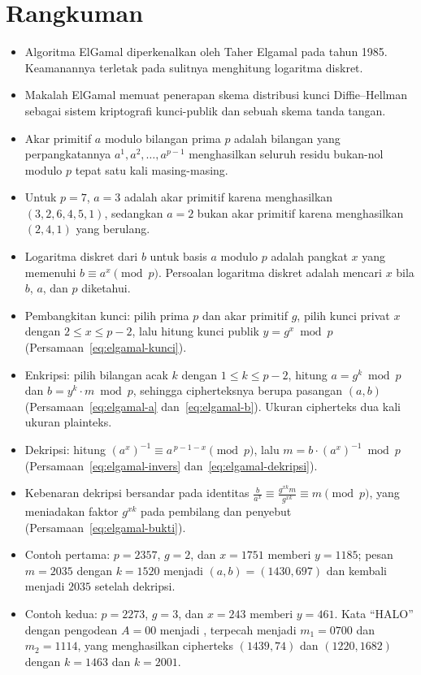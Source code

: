 \section{Rangkuman}
\begin{itemize}
    \item Algoritma ElGamal diperkenalkan oleh Taher Elgamal pada tahun 1985.
    Keamanannya terletak pada sulitnya menghitung logaritma diskret.
    \item Makalah ElGamal memuat penerapan skema distribusi kunci
    Diffie--Hellman sebagai sistem kriptografi kunci-publik dan sebuah skema
    tanda tangan.
    \item Akar primitif $a$ modulo bilangan prima $p$ adalah bilangan yang
    perpangkatannya $a^{1}, a^{2}, \dots, a^{p-1}$ menghasilkan seluruh residu
    bukan-nol modulo $p$ tepat satu kali masing-masing.
    \item Untuk $p = 7$, $a = 3$ adalah akar primitif karena menghasilkan
    $(3, 2, 6, 4, 5, 1)$, sedangkan $a = 2$ bukan akar primitif karena
    menghasilkan $(2, 4, 1)$ yang berulang.
    \item Logaritma diskret dari $b$ untuk basis $a$ modulo $p$ adalah pangkat
    $x$ yang memenuhi $b \equiv a^{x} \pmod p$. Persoalan logaritma diskret
    adalah mencari $x$ bila $b$, $a$, dan $p$ diketahui.
    \item Pembangkitan kunci: pilih prima $p$ dan akar primitif $g$, pilih
    kunci privat $x$ dengan $2 \le x \le p-2$, lalu hitung kunci publik
    $y = g^{x} \bmod p$ (Persamaan~\eqref{eq:elgamal-kunci}).
    \item Enkripsi: pilih bilangan acak $k$ dengan $1 \le k \le p-2$, hitung
    $a = g^{k} \bmod p$ dan $b = y^{k} \cdot m \bmod p$, sehingga cipherteksnya
    berupa pasangan $(a, b)$ (Persamaan~\eqref{eq:elgamal-a}
    dan~\eqref{eq:elgamal-b}). Ukuran cipherteks dua kali ukuran plainteks.
    \item Dekripsi: hitung $\left(a^{x}\right)^{-1} \equiv a^{\,p-1-x}
    \pmod p$, lalu $m = b \cdot \left(a^{x}\right)^{-1} \bmod p$
    (Persamaan~\eqref{eq:elgamal-invers} dan~\eqref{eq:elgamal-dekripsi}).
    \item Kebenaran dekripsi bersandar pada identitas $\frac{b}{a^{x}} \equiv
    \frac{g^{xk} m}{g^{xk}} \equiv m \pmod p$, yang meniadakan faktor $g^{xk}$
    pada pembilang dan penyebut (Persamaan~\eqref{eq:elgamal-bukti}).
    \item Contoh pertama: $p = 2357$, $g = 2$, dan $x = 1751$ memberi
    $y = 1185$; pesan $m = 2035$ dengan $k = 1520$ menjadi $(a, b) = (1430,
    697)$ dan kembali menjadi $2035$ setelah dekripsi.
    \item Contoh kedua: $p = 2273$, $g = 3$, dan $x = 243$ memberi $y = 461$.
    Kata ``HALO'' dengan pengodean $A = 00$ menjadi , terpecah
    menjadi $m_{1} = 0700$ dan $m_{2} = 1114$, yang menghasilkan cipherteks
    $(1439, 74)$ dan $(1220, 1682)$ dengan $k = 1463$ dan $k = 2001$.
\end{itemize}

